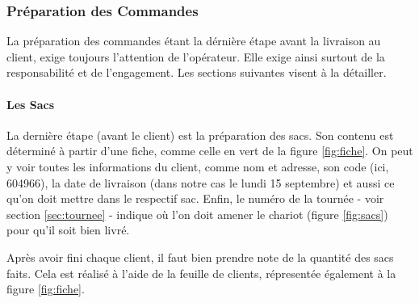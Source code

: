 \documentclass{article}
\begin{document}
\subsubsection{Préparation des Commandes}

La préparation des commandes étant la dérnière étape avant la livraison au
client, exige toujours l'attention de l'opérateur. Elle exige ainsi surtout de
la responsabilité et de l'engagement. Les sections suivantes visent à la
détailler.

\paragraph{Les Sacs}

La dernière étape (avant le client) est la préparation des sacs. Son contenu est
déterminé à partir d'une fiche, comme celle en vert de la figure
\ref{fig:fiche}. On peut y voir toutes les informations du client, comme nom et
adresse, son code (ici, 604966), la date de livraison (dans notre cas le lundi
15 septembre) et aussi ce qu'on doit mettre dans le respectif sac. Enfin, le
numéro de la tournée - voir section \ref{sec:tournee} - indique où l'on doit
amener le chariot (figure \ref{fig:sacs}) pour qu'il soit bien livré.

\vspace{12pt}

Après avoir fini chaque client, il faut bien prendre note de la
quantité des sacs faits. Cela est réalisé à l'aide de la feuille de clients,
répresentée également à la figure \ref{fig:fiche}.
\end{document}
